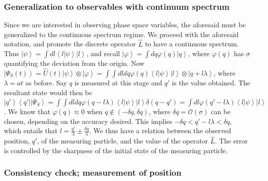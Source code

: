 \subsubsection{Generalization to observables with continuum spectrum \label{sub:BM-measurement-to-continuous}}

Since we are interested in observing phase space variables, the aforesaid
must be generalized to the continuous spectrum regime. We proceed
with the aforesaid notation, and promote the discrete operator $\hat{L}$
to have a continuous spectrum. Thus $\left|\psi\right\rangle =\int dl\left\langle l|\psi\right\rangle \left|l\right\rangle $,
and recall $\left|\varphi\right\rangle =\int dq\varphi(q)\left|q\right\rangle $,
where $\varphi(q)$ has $\sigma$ quantifying the deviation from the
origin. Now $\left|\Psi_{S}(t)\right\rangle =\hat{U}(t)\left|\psi\right\rangle \otimes\left|\varphi\right\rangle =\int\int dldq\varphi(q)\left\langle l|\psi\right\rangle \left|l\right\rangle \otimes\left|q+l\lambda\right\rangle $,
where $\lambda=at$ as before. Say $q$ is measured at this stage
and $q'$ is the value obtained. The resultant state would then be
$\left|q'\right\rangle \left\langle q'\right|\left|\Psi_{S}\right\rangle =\int\int dldq\varphi(q-l\lambda)\left\langle l|\psi\right\rangle \left|l\right\rangle \delta(q-q')=\int dl\varphi(q'-l\lambda)\left\langle l|\psi\right\rangle \left|l\right\rangle $.
We know that $\varphi(q)\approx0$ when $q\notin(-\delta q,\delta q)$,
where $\delta q=\mathcal{O}(\sigma)$ can be chosen, depending on
the accuracy desired. This implies $-\delta q<q'-l\lambda<\delta q$,
which entails that $l=\frac{q'}{\lambda}\pm\frac{\delta q}{\lambda}$.
We thus have a relation between the observed position, $q'$, of the
measuring particle, and the value of the operator $\hat{L}$. The
error is controlled by the sharpness of the initial state of the measuring
particle.


\subsubsection{Consistency check; measurement of position \label{sub:BM-Consistency-check-measurement}}

